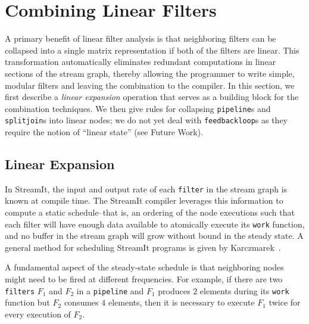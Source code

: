 \section{Combining Linear Filters}
A primary benefit of linear filter analysis is that neighboring
filters can be collapsed into a single matrix representation if both
of the filters are linear.  This transformation automatically
eliminates redundant computations in linear sections of the stream
graph, thereby allowing the programmer to write simple, modular
filters and leaving the combination to the compiler.  In this section,
we first describe a {\it linear expansion} operation that serves as a
building block for the combination techniques.  We then give rules for
collapsing {\tt pipeline}s and {\tt splitjoin}s into linear nodes; we
do not yet deal with {\tt feedbackloop}s as they require the notion of
``linear state'' (see Future Work).

\subsection{Linear Expansion}

In StreamIt, the input and output rate of each {\tt filter} in the
stream graph is known at compile time.  The StreamIt compiler
leverages this information to compute a static schedule--that is, an
ordering of the node executions such that each filter will have enough
data available to atomically execute its {\tt work} function, and no
buffer in the stream graph will grow without bound in the steady
state.  A general method for scheduling StreamIt programs is given by
Karczmarek~\cite{karczma-thesis}.

A fundamental aspect of the steady-state schedule is that neighboring
nodes might need to be fired at different frequencies.  For example,
if there are two {\tt filters} $F_1$ and $F_2$ in a {\tt pipeline} and
$F_1$ produces $2$ elements during its {\tt work} function but $F_2$
consumes $4$ elements, then it is necessary to execute $F_1$ twice for
every execution of $F_2$.


